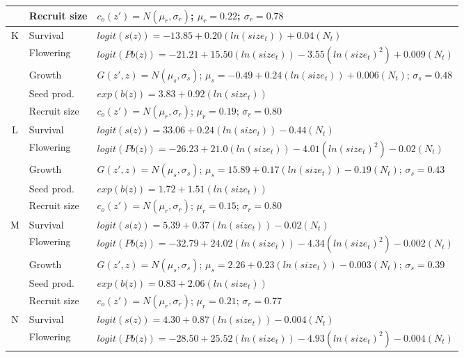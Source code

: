 \documentclass[12pt, letterpaper]{article}
\begin{document}
\begin{spacing}{1.3}
\begin{longtable}[ht!]{c|l|p{}}
         & Recruit size  &  $c_o(z') = N(\mu_r, \sigma_r)$; $\mu_r = 0.22$; $\sigma_r = 0.78$ \\
         \hline
         K\rowcolor[gray]{.95} &  Survival  &  $logit(\textit{s(z)})= -13.85 +0.20(ln(size_t)) + 0.04(N_t)$ \\
         & Flowering  & $logit(\textit{Pb(z)})  = -21.21 + 15.50(ln(size_t)) -3.55(ln(size_t)^2) + 0.009(N_t)$ \\
         \rowcolor[gray]{.95}& Growth  &  $G(z',z) = N(\mu_s, \sigma_s)$; $\mu_s = -0.49 + 0.24(ln(size_t)) + 0.006(N_t)$; $\sigma_s = 0.48$\\
         & Seed prod.  & $exp(\textit{b(z)}) = 3.83 + 0.92(ln(size_t))$  \\
         \rowcolor[gray]{.95}& Recruit size  &  $c_o(z') = N(\mu_r, \sigma_r)$; $\mu_r = 0.19$; $\sigma_r = 0.80$ \\
         \hline
         L  &  Survival  &  $logit(\textit{s(z)})= 33.06 + 0.24(ln(size_t)) -0.44(N_t)$ \\
         \rowcolor[gray]{.95}& Flowering  & $logit(\textit{Pb(z)})  = -26.23 + 21.0(ln(size_t)) -4.01(ln(size_t)^2) -0.02(N_t)$ \\
         & Growth  &  $G(z',z) = N(\mu_s, \sigma_s)$; $\mu_s = 15.89 + 0.17(ln(size_t)) -0.19(N_t)$; $\sigma_s = 0.43$\\
         \rowcolor[gray]{.95}& Seed prod.  & $exp(\textit{b(z)}) = 1.72 + 1.51(ln(size_t))$  \\
         & Recruit size  &  $c_o(z') = N(\mu_r, \sigma_r)$; $\mu_r = 0.15$; $\sigma_r = 0.80$ \\
         \hline
         \rowcolor[gray]{.95}M  &  Survival  &  $logit(\textit{s(z)})= 5.39 + 0.37(ln(size_t)) -0.02(N_t)$ \\
         & Flowering  & $logit(\textit{Pb(z)})  = -32.79 + 24.02(ln(size_t)) -4.34(ln(size_t)^2) -0.002(N_t)$ \\
         \rowcolor[gray]{.95}& Growth  &  $G(z',z) = N(\mu_s, \sigma_s)$; $\mu_s = 2.26 + 0.23(ln(size_t)) - 0.003(N_t)$; $\sigma_s = 0.39$\\
         & Seed prod.  & $exp(\textit{b(z)}) = 0.83 + 2.06(ln(size_t))$  \\
         \rowcolor[gray]{.95}& Recruit size  &  $c_o(z') = N(\mu_r, \sigma_r)$; $\mu_r = 0.21$; $\sigma_r = 0.77$ \\
         \hline
         N  &  Survival  &  $logit(\textit{s(z)})= 4.30 + 0.87(ln(size_t)) -0.004(N_t)$ \\
         \rowcolor[gray]{.95}& Flowering  & $logit(\textit{Pb(z)})  = -28.50 + 25.52(ln(size_t)) -4.93(ln(size_t)^2) -0.004(N_t)$ \\

\end{longtable}
\end{spacing}
\end{document}
